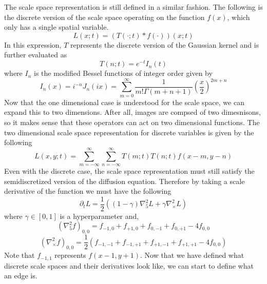 \documentclass{article}
\begin{document}
The scale space representation is still defined in a similar fashion.
The following is the discrete version of the scale space operating on the function $f(x)$, which only has a single spatial variable.
\begin{equation}
  L(x;t) = (T(\cdot;t) * f(\cdot))(x;t)
\end{equation}
In this expression, $T$ represents the discrete version of the Gaussian kernel and is further evaluated as \cite{Lindeberg1993}
\begin{equation}
  T(n;t) = e^{-t}I_n(t)
\end{equation}
where $I_n$ is the modified Bessel functions of integer order given by
\begin{equation}
  I_n(x) = i^{-n}J_{n}(ix) = \sum_{m=0}^{\infty}\frac{1}{m!\Gamma(m+n+1)}\left(\frac{x}{2}\right)^{2m+n}
\end{equation}
Now that the one dimensional case is understood for the scale space, we can expand this to two dimensions.
After all, images are compsed of two dimesnisons, so it makes sense that these operators can act on two dimensional functions.
The two dimensional scale space representation for discrete variables is given by the following
\begin{equation}
  L(x,y;t) = \sum_{m=-\infty}^{\infty}\sum_{n=-\infty}^{\infty}T(m;t)T(n;t)f(x-m,y-n)
\end{equation}
Even with the discrete case, the scale space representation must still satisfy the semidiscretized version of the diffusion equation.
Therefore by taking a scale derivative of the function we must have the following \cite{Lindeberg1993}
\begin{equation}
  \partial_t L = \frac{1}{2}((1-\gamma)\nabla^2_5L+\gamma\nabla^2_\times L)
\end{equation}
where $\gamma \in [0,1]$ is a hyperparameter and,
\begin{equation}
  (\nabla^2_5f)_{0,0} = f_{-1,0} + f_{+1,0} + f_{0,-1} + f_{0,+1} - 4f_{0,0}
\end{equation}
\begin{equation}
  (\nabla^2_\times f)_{0,0} = \frac{1}{2}(f_{-1,-1} + f_{-1,+1} + f_{+1,-1} + f_{+1,+1} - 4f_{0,0})
\end{equation}
Note that $f_{-1,1}$ represents $f(x-1, y+1)$. Now that we have defined what discrete scale spaces and their derivatives look like, we can start to define what an edge is.
\end{document}
